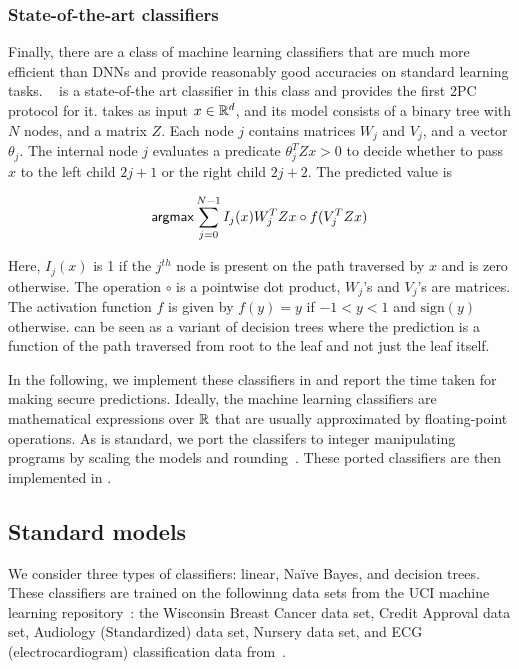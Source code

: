 \subsubsection*{State-of-the-art classifiers}
Finally, there are a class of machine learning classifiers that are
much more efficient than
DNNs and provide reasonably good accuracies on standard learning
tasks. \bonsai~\cite{bonsai} is a state-of-the art classifier in this
class and \tool provides the first 2PC protocol for it.
\bonsai takes as input $x \in {\mathbb{R}}^d$, and its model consists of a
binary tree with $N$ nodes, and a matrix $Z$. Each node $j$ contains
matrices $W_j$ and $V_j$, and a vector $\theta_{j}$. The internal node
$j$  evaluates a predicate $\theta_j^TZx > 0$ to decide whether
to pass $x$ to the left child $2j+1$ or the right child $2j+2$.
The predicted value is


\[
{\sf argmax} \sum_{j = 0}^{N - 1} I_j(x)W_j^TZx\circ f(V_j^TZx) 
\]

Here, $I_j(x)$ is 1 if the $j^{th}$ node is present on the path traversed by $x$
and is zero otherwise. 
The operation $\circ$ is a pointwise dot product, $W_j$'s and $V_j$'s
are matrices. The activation function $f$ is given by $f(y) = y$ if
$-1 < y < 1$ and $\mathrm{sign}(y)$ otherwise. \bonsai can be
seen as a variant of decision trees where the prediction is a function
of the path traversed from root to the leaf and not just the leaf
itself.

In the following, we implement these classifiers in \tool and report
the time taken for making secure predictions. Ideally, the machine
learning classifiers are mathematical expressions over ${\mathbb{R}}$ that are
usually approximated by floating-point operations. 
As is standard, we port the classifers to integer manipulating
programs by scaling the models and rounding~\cite{minionn}. These
ported classifiers are then implemented in \tool.

\subsection{Standard models}
\label{sec:shallow}
We consider three types of classifiers: linear, Na\"{i}ve Bayes, and decision trees. 
These classifiers are trained on the followinng data sets from the UCI  machine learning repository~\cite{uci}:
 the Wisconsin Breast Cancer data set, 
Credit Approval data set, Audiology (Standardized) data set, Nursery data set, and
ECG (electrocardiogram) classification data from~\cite{barni}.


